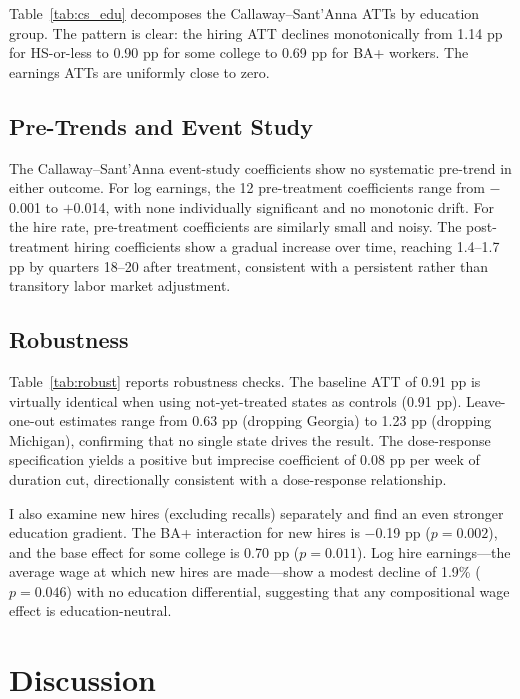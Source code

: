 \documentclass[12pt]{article}
\begin{document}


Table~\ref{tab:cs_edu} decomposes the Callaway--Sant'Anna ATTs by education group. The pattern is clear: the hiring ATT declines monotonically from 1.14 pp for HS-or-less to 0.90 pp for some college to 0.69 pp for BA+ workers. The earnings ATTs are uniformly close to zero.

\subsection{Pre-Trends and Event Study}

The Callaway--Sant'Anna event-study coefficients show no systematic pre-trend in either outcome. For log earnings, the 12 pre-treatment coefficients range from $-$0.001 to $+$0.014, with none individually significant and no monotonic drift. For the hire rate, pre-treatment coefficients are similarly small and noisy. The post-treatment hiring coefficients show a gradual increase over time, reaching 1.4--1.7 pp by quarters 18--20 after treatment, consistent with a persistent rather than transitory labor market adjustment.

\subsection{Robustness}



Table~\ref{tab:robust} reports robustness checks. The baseline ATT of 0.91 pp is virtually identical when using not-yet-treated states as controls (0.91 pp). Leave-one-out estimates range from 0.63 pp (dropping Georgia) to 1.23 pp (dropping Michigan), confirming that no single state drives the result. The dose-response specification yields a positive but imprecise coefficient of 0.08 pp per week of duration cut, directionally consistent with a dose-response relationship.

I also examine new hires (excluding recalls) separately and find an even stronger education gradient. The BA+ interaction for new hires is $-$0.19 pp ($p = 0.002$), and the base effect for some college is 0.70 pp ($p = 0.011$). Log hire earnings---the average wage at which new hires are made---show a modest decline of 1.9\% ($p = 0.046$) with no education differential, suggesting that any compositional wage effect is education-neutral.


\section{Discussion}
\end{document}
